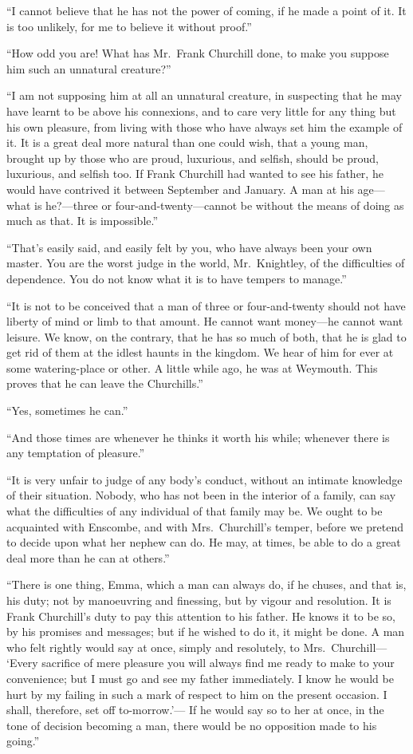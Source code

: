 ``I cannot believe that he has not the power of coming, if he made
a point of it.  It is too unlikely, for me to believe it without proof.''

``How odd you are!  What has Mr.\ Frank Churchill done, to make you
suppose him such an unnatural creature?''

``I am not supposing him at all an unnatural creature, in suspecting
that he may have learnt to be above his connexions, and to care
very little for any thing but his own pleasure, from living with
those who have always set him the example of it.  It is a great deal
more natural than one could wish, that a young man, brought up
by those who are proud, luxurious, and selfish, should be proud,
luxurious, and selfish too.  If Frank Churchill had wanted to see
his father, he would have contrived it between September and January.
A man at his age---what is he?---three or four-and-twenty---cannot be
without the means of doing as much as that.  It is impossible.''

``That's easily said, and easily felt by you, who have always
been your own master.  You are the worst judge in the world,
Mr.\ Knightley, of the difficulties of dependence.  You do not know
what it is to have tempers to manage.''

``It is not to be conceived that a man of three or four-and-twenty
should not have liberty of mind or limb to that amount.  He cannot
want money---he cannot want leisure.  We know, on the contrary,
that he has so much of both, that he is glad to get rid of them at
the idlest haunts in the kingdom.  We hear of him for ever at some
watering-place or other.  A little while ago, he was at Weymouth.
This proves that he can leave the Churchills.''

``Yes, sometimes he can.''

``And those times are whenever he thinks it worth his while;
whenever there is any temptation of pleasure.''

``It is very unfair to judge of any body's conduct, without an
intimate knowledge of their situation.  Nobody, who has not been
in the interior of a family, can say what the difficulties
of any individual of that family may be.  We ought to be
acquainted with Enscombe, and with Mrs.\ Churchill's temper,
before we pretend to decide upon what her nephew can do.
He may, at times, be able to do a great deal more than he can at others.''

``There is one thing, Emma, which a man can always do, if he chuses,
and that is, his duty; not by manoeuvring and finessing, but by vigour
and resolution.  It is Frank Churchill's duty to pay this attention
to his father.  He knows it to be so, by his promises and messages;
but if he wished to do it, it might be done.  A man who felt rightly
would say at once, simply and resolutely, to Mrs.\ Churchill---%
`Every sacrifice of mere pleasure you will always find me ready to make
to your convenience; but I must go and see my father immediately.
I know he would be hurt by my failing in such a mark of respect to him
on the present occasion.  I shall, therefore, set off to-morrow.'---%
If he would say so to her at once, in the tone of decision becoming
a man, there would be no opposition made to his going.''

